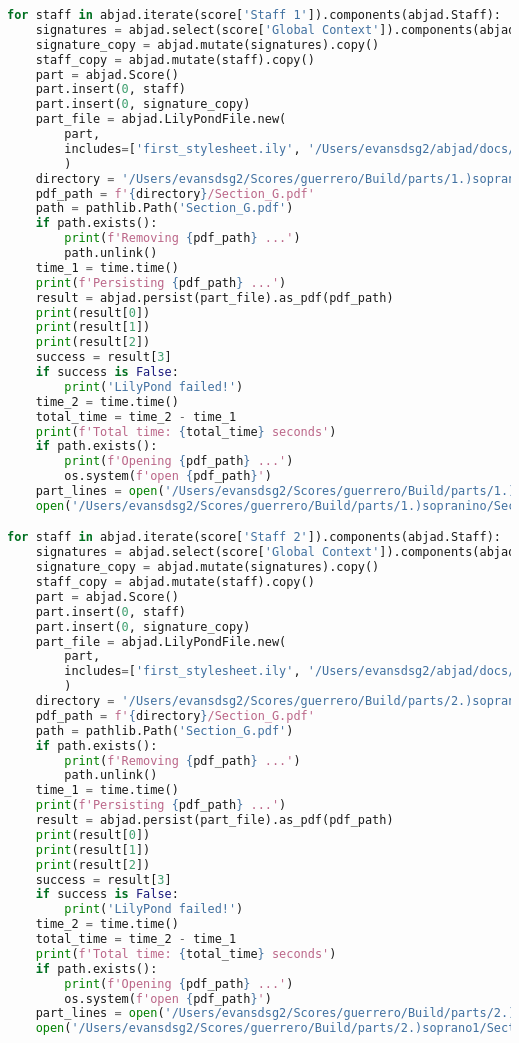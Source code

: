 \begin{lstlisting}[language=Python, caption=Invocation Source Code]
for staff in abjad.iterate(score['Staff 1']).components(abjad.Staff):
    signatures = abjad.select(score['Global Context']).components(abjad.Staff)
    signature_copy = abjad.mutate(signatures).copy()
    staff_copy = abjad.mutate(staff).copy()
    part = abjad.Score()
    part.insert(0, staff)
    part.insert(0, signature_copy)
    part_file = abjad.LilyPondFile.new(
        part,
        includes=['first_stylesheet.ily', '/Users/evansdsg2/abjad/docs/source/_stylesheets/abjad.ily'],
        )
    directory = '/Users/evansdsg2/Scores/guerrero/Build/parts/1.)sopranino'
    pdf_path = f'{directory}/Section_G.pdf'
    path = pathlib.Path('Section_G.pdf')
    if path.exists():
        print(f'Removing {pdf_path} ...')
        path.unlink()
    time_1 = time.time()
    print(f'Persisting {pdf_path} ...')
    result = abjad.persist(part_file).as_pdf(pdf_path)
    print(result[0])
    print(result[1])
    print(result[2])
    success = result[3]
    if success is False:
        print('LilyPond failed!')
    time_2 = time.time()
    total_time = time_2 - time_1
    print(f'Total time: {total_time} seconds')
    if path.exists():
        print(f'Opening {pdf_path} ...')
        os.system(f'open {pdf_path}')
    part_lines = open('/Users/evansdsg2/Scores/guerrero/Build/parts/1.)sopranino/Section_G.ly').readlines()
    open('/Users/evansdsg2/Scores/guerrero/Build/parts/1.)sopranino/Section_G.ly', 'w').writelines(part_lines[15:-1])

for staff in abjad.iterate(score['Staff 2']).components(abjad.Staff):
    signatures = abjad.select(score['Global Context']).components(abjad.Staff)
    signature_copy = abjad.mutate(signatures).copy()
    staff_copy = abjad.mutate(staff).copy()
    part = abjad.Score()
    part.insert(0, staff)
    part.insert(0, signature_copy)
    part_file = abjad.LilyPondFile.new(
        part,
        includes=['first_stylesheet.ily', '/Users/evansdsg2/abjad/docs/source/_stylesheets/abjad.ily'],
        )
    directory = '/Users/evansdsg2/Scores/guerrero/Build/parts/2.)soprano1'
    pdf_path = f'{directory}/Section_G.pdf'
    path = pathlib.Path('Section_G.pdf')
    if path.exists():
        print(f'Removing {pdf_path} ...')
        path.unlink()
    time_1 = time.time()
    print(f'Persisting {pdf_path} ...')
    result = abjad.persist(part_file).as_pdf(pdf_path)
    print(result[0])
    print(result[1])
    print(result[2])
    success = result[3]
    if success is False:
        print('LilyPond failed!')
    time_2 = time.time()
    total_time = time_2 - time_1
    print(f'Total time: {total_time} seconds')
    if path.exists():
        print(f'Opening {pdf_path} ...')
        os.system(f'open {pdf_path}')
    part_lines = open('/Users/evansdsg2/Scores/guerrero/Build/parts/2.)soprano1/Section_G.ly').readlines()
    open('/Users/evansdsg2/Scores/guerrero/Build/parts/2.)soprano1/Section_G.ly', 'w').writelines(part_lines[15:-1])


\end{lstlisting}
